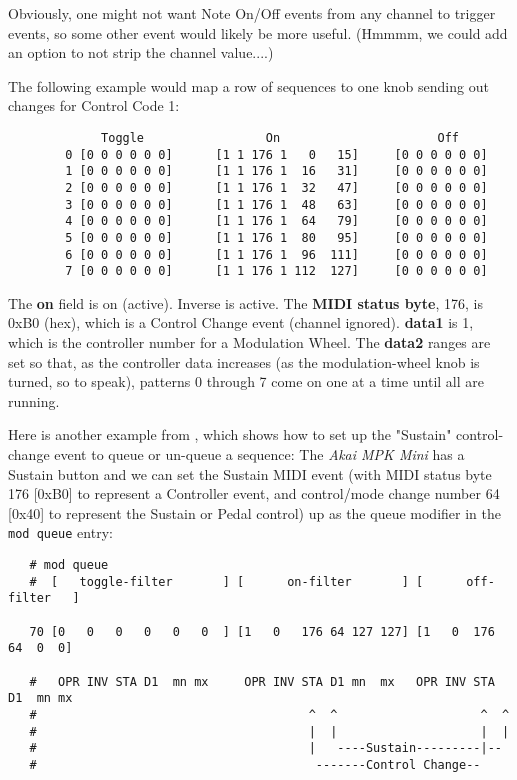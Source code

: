    Obviously, one might not want Note On/Off events from any channel to trigger
   events, so some other event would likely be more useful.
   (Hmmmm, we could add an option to not strip the channel value....)

   The following example would map a row of sequences to one knob sending
   out changes for Control Code 1:

   \begin{verbatim}
             Toggle                 On                      Off
        0 [0 0 0 0 0 0]      [1 1 176 1   0   15]     [0 0 0 0 0 0]
        1 [0 0 0 0 0 0]      [1 1 176 1  16   31]     [0 0 0 0 0 0]
        2 [0 0 0 0 0 0]      [1 1 176 1  32   47]     [0 0 0 0 0 0]
        3 [0 0 0 0 0 0]      [1 1 176 1  48   63]     [0 0 0 0 0 0]
        4 [0 0 0 0 0 0]      [1 1 176 1  64   79]     [0 0 0 0 0 0]
        5 [0 0 0 0 0 0]      [1 1 176 1  80   95]     [0 0 0 0 0 0]
        6 [0 0 0 0 0 0]      [1 1 176 1  96  111]     [0 0 0 0 0 0]
        7 [0 0 0 0 0 0]      [1 1 176 1 112  127]     [0 0 0 0 0 0]
   \end{verbatim}

   The \textbf{on} field is on (active).  Inverse is active.  The
   \textbf{MIDI status byte}, 176, is 0xB0 (hex), which is a Control Change
   event (channel ignored).  \textbf{data1} is 1, which is the controller
   number for a Modulation Wheel.  The \textbf{data2} ranges are set so
   that, as the controller data increases (as the modulation-wheel knob is
   turned, so to speak), patterns 0 through 7 come on one at a time until
   all are running.

   Here is another example from \cite{midicontrol}, which shows how to set up
   the "Sustain" control-change event to queue or un-queue a sequence:
   The \textsl{Akai MPK Mini} has a Sustain button and we can set the
   Sustain MIDI event (with MIDI status byte 176 [0xB0] to represent a
   Controller event, and control/mode change number 64 [0x40] to
   represent the Sustain or Pedal control) up as the queue modifier in
   the \texttt{mod queue} entry:

   \begin{verbatim}
   # mod queue
   #  [   toggle-filter       ] [      on-filter       ] [      off-filter   ]

   70 [0   0   0   0   0   0  ] [1   0   176 64 127 127] [1   0  176 64  0  0]

   #   OPR INV STA D1  mn mx     OPR INV STA D1 mn  mx   OPR INV STA D1  mn mx
   #                                      ^  ^                    ^  ^
   #                                      |  |                    |  |
   #                                      |   ----Sustain---------|--
   #                                       -------Control Change--
   \end{verbatim}

